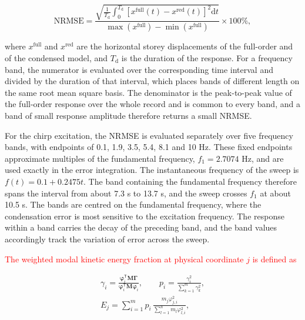 \documentclass[a4paper,fleqn,review,12pt]{cas-sc}
\newcommand{\rev}[1]{\textcolor{red}{#1}}
\begin{document}
\vspace{-3.5em}
\begin{equation}
	\mathrm{NRMSE}=
	\frac{\displaystyle\sqrt{\frac{1}{T_{\mathrm{d}}}\int_{0}^{T_{\mathrm{d}}}
			\left[x^{\mathrm{full}}(t)-x^{\mathrm{red}}(t)\right]^{2}\mathrm{d}t}}
	{\max\left(x^{\mathrm{full}}\right)-\min\left(x^{\mathrm{full}}\right)}
	\times100\%,
	\label{eq:nrmse}
\end{equation}
\vspace{-3.5em}

\noindent where \(x^{\mathrm{full}}\) and \(x^{\mathrm{red}}\) are the horizontal storey displacements of the full-order and of the condensed model, and \(T_{\mathrm{d}}\) is the duration of the response. For a frequency band, the numerator is evaluated over the corresponding time interval and divided by the duration of that interval, which places bands of different length on the same root mean square basis. The denominator is the peak-to-peak value of the full-order response over the whole record and is common to every band, and a band of small response amplitude therefore returns a small NRMSE.

For the chirp excitation, the NRMSE is evaluated separately over five frequency bands, with endpoints of 0.1, 1.9, 3.5, 5.4, 8.1 and 10 Hz. These fixed endpoints approximate multiples of the fundamental frequency, \(f_1=2.7074\) Hz, and are used exactly in the error integration. The instantaneous frequency of the sweep is \(f(t)=0.1+0.2475t\). The band containing the fundamental frequency therefore spans the interval from about 7.3 s to 13.7 s, and the sweep crosses \(f_{1}\) at about 10.5 s. The bands are centred on the fundamental frequency, where the condensation error is most sensitive to the excitation frequency. The response within a band carries the decay of the preceding band, and the band values accordingly track the variation of error across the sweep.

\rev{The weighted modal kinetic energy fraction at physical coordinate \(j\) is defined as}

\vspace{-3.5em}
\begin{equation}
	\begin{gathered}
		\gamma_{i}=
		\frac{\bm{\varphi}_{i}^{\mathsf{T}}\mathbf{M}\bm{\Gamma}}
		{\bm{\varphi}_{i}^{\mathsf{T}}\mathbf{M}\bm{\varphi}_{i}},
		\qquad
		p_{i}=\frac{\gamma_{i}^{2}}{\displaystyle\sum_{k=1}^{m}\gamma_{k}^{2}},\\[2pt]
		E_{j}=\sum_{i=1}^{m}p_{i}\,
		\frac{m_{j}\varphi_{j,i}^{2}}{\displaystyle\sum_{l=1}^{n}m_{l}\varphi_{l,i}^{2}},
	\end{gathered}
	\label{eq:dof-energy}
\end{equation}
\vspace{-2.5em}
\end{document}
